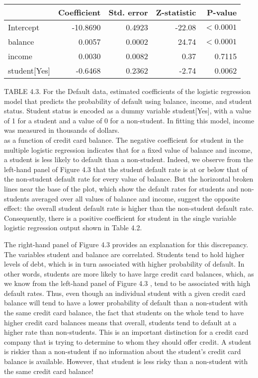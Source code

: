 \documentclass[10pt]{article}
\begin{document}

\begin{center}
\begin{tabular}{lrrrr}
\hline
 & Coefficient & Std. error & Z-statistic & P-value \\
\hline
Intercept & -10.8690 & 0.4923 & -22.08 & $<0.0001$ \\
balance & 0.0057 & 0.0002 & 24.74 & $<0.0001$ \\
income & 0.0030 & 0.0082 & 0.37 & 0.7115 \\
student[Yes] & -0.6468 & 0.2362 & -2.74 & 0.0062 \\
\hline
\end{tabular}
\end{center}

TABLE 4.3. For the Default data, estimated coefficients of the logistic regression model that predicts the probability of default using balance, income, and student status. Student status is encoded as a dummy variable student[Yes], with a value of 1 for a student and a value of 0 for a non-student. In fitting this model, income was measured in thousands of dollars.\\
as a function of credit card balance. The negative coefficient for student in the multiple logistic regression indicates that for a fixed value of balance and income, a student is less likely to default than a non-student. Indeed, we observe from the left-hand panel of Figure 4.3 that the student default rate is at or below that of the non-student default rate for every value of balance. But the horizontal broken lines near the base of the plot, which show the default rates for students and non-students averaged over all values of balance and income, suggest the opposite effect: the overall student default rate is higher than the non-student default rate. Consequently, there is a positive coefficient for student in the single variable logistic regression output shown in Table 4.2.

The right-hand panel of Figure 4.3 provides an explanation for this discrepancy. The variables student and balance are correlated. Students tend to hold higher levels of debt, which is in turn associated with higher probability of default. In other words, students are more likely to have large credit card balances, which, as we know from the left-hand panel of Figure 4.3 , tend to be associated with high default rates. Thus, even though an individual student with a given credit card balance will tend to have a lower probability of default than a non-student with the same credit card balance, the fact that students on the whole tend to have higher credit card balances means that overall, students tend to default at a higher rate than non-students. This is an important distinction for a credit card company that is trying to determine to whom they should offer credit. A student is riskier than a non-student if no information about the student's credit card balance is available. However, that student is less risky than a non-student with the same credit card balance!
\end{document}
